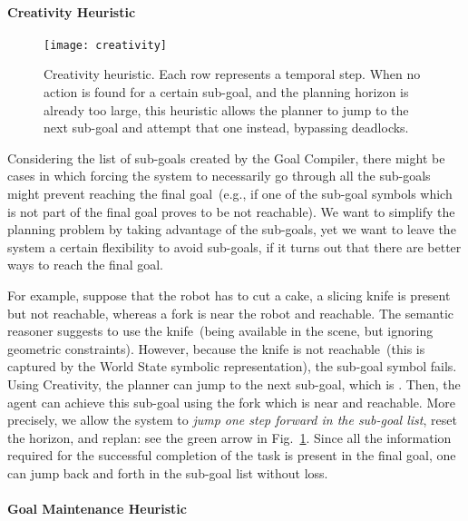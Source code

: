 \paragraph{Creativity Heuristic}
\label{heu:creativity}

\begin{figure}
\centering
\texttt{[image: creativity]}
\caption[Creativity heuristic.]{Creativity heuristic. Each row represents a temporal step. When no action is found for a certain sub-goal, and the planning horizon is already too large, this heuristic allows the planner to jump to the next sub-goal and attempt that one instead, bypassing deadlocks.}
\label{fig:creativity}
\end{figure}

Considering the list of sub-goals created by the Goal Compiler,
there might be cases in which forcing the system to necessarily go through all the sub-goals might prevent reaching the final goal~(e.g., if one of the sub-goal symbols which is not part of the final goal proves to be not reachable).
We want to simplify the planning problem by taking advantage of the sub-goals, yet we want to leave the system a certain flexibility to avoid sub-goals, if it turns out that there are better ways to reach the final goal.

For example, suppose that the robot has to cut a cake, a slicing knife is present but not reachable, whereas a fork is near the robot and reachable.
The semantic reasoner suggests to use the knife~(being available in the scene, but ignoring geometric constraints).
However, because the knife is not reachable~(this is captured by the World State symbolic representation), the sub-goal symbol  fails.
Using Creativity, the planner can jump to the next sub-goal, which is .
Then, the agent can achieve this sub-goal using the fork which is near and reachable.
More precisely, we allow the system to \emph{jump one step forward in the sub-goal list}, reset the horizon, and replan: see the green arrow in Fig.~\ref{fig:creativity}.
Since all the information required for the successful completion of the task is present in the final goal, one can jump back and forth in the sub-goal list without loss.

\paragraph{Goal Maintenance Heuristic}
\label{heu:goal_maintenance}

